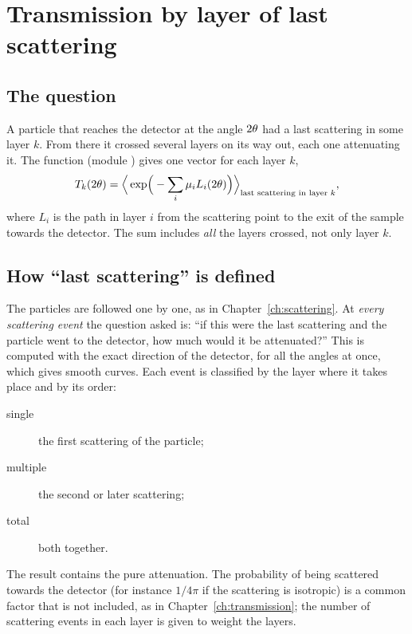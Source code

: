 \chapter{Transmission by layer of last scattering}
\label{ch:lastlayer}

\section{The question}

A particle that reaches the detector at the angle $2\theta$ had a last scattering in some layer $k$. From there it crossed several layers on its way out,
each one attenuating it. The function  (module ) gives one vector for each layer $k$,
\begin{equation}
  T_k(2\theta)=\Big\langle \exp\!\Big(-\sum_i\mu_iL_i(2\theta)\Big)\Big\rangle_{\text{last scattering in layer }k},
\end{equation}
where $L_i$ is the path in layer $i$ from the scattering point to the exit of the sample towards the detector. The sum includes \emph{all} the layers crossed,
not only layer $k$.

\section{How ``last scattering'' is defined}

The particles are followed one by one, as in Chapter~\ref{ch:scattering}. At \emph{every scattering event} the question asked is: ``if this were the last
scattering and the particle went to the detector, how much would it be attenuated?'' This is computed with the exact direction of the detector, for
all the angles at once, which gives smooth curves. Each event is classified by the layer where it takes place and by its order:
\begin{description}
  \item[single] the first scattering of the particle;
  \item[multiple] the second or later scattering;
  \item[total] both together.
\end{description}
The result contains the pure attenuation. The probability of being scattered towards the detector (for instance $1/4\pi$ if the scattering is isotropic)
is a common factor that is not included, as in Chapter~\ref{ch:transmission}; the number of scattering events in each layer is given to weight the layers.

